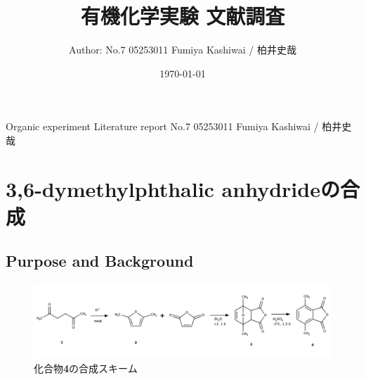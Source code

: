 \documentclass{ltjsarticle}
\title{有機化学実験 文献調査}
\date{\today}
\author{Author: No.7 05253011 Fumiya Kashiwai / 柏井史哉}
\theoremstyle{definition}
\numberwithin{equation}{section}
\begin{document}
\maketitle
{} {Organic experiment Literature report No.7 05253011 Fumiya Kashiwai / 柏井史哉}

\newpage
\section{3,6-dymethylphthalic anhydrideの合成}
\subsection{Purpose and Background}
\begin{figure}[htbp]
\begin{center}
\includegraphics[width = 15 cm]{scheme6-1.png}
\caption{化合物\textbf{4}の合成スキーム}
\label{scheme_6-1}
\end{center}
\end{figure}
\end{document}
